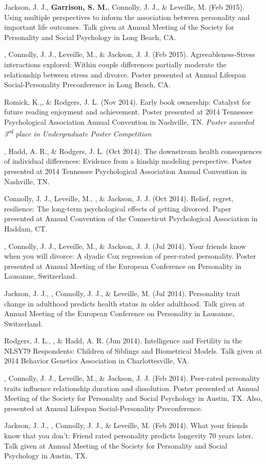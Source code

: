 \item Jackson, J. J., \textbf{Garrison, S. M.}, Connolly, J. J., \& Leveille, M. (Feb 2015). Using multiple perspectives to inform the association between personality and important life outcomes. Talk given at Annual Meeting of the Society for Personality and Social Psychology in Long Beach, CA.
\item\meb, Connolly, J. J., Leveille, M., \& Jackson, J. J. (Feb 2015). Agreeableness-Stress interactions explored: Within couple differences partially moderate the relationship between stress and divorce. Poster presented at Annual Lifespan Social-Personality Preconference in Long Beach, CA.
%
\item Romick, K.,\nota \meb, \& Rodgers, J. L. (Nov 2014). Early book ownership: Catalyst for future reading enjoyment and achievement. Poster presented at 2014 Tennessee Psychological Association Annual Convention in  Nashville, TN. \textit{Poster awarded 3\textsuperscript{rd} place in Undergraduate Poster Competition}
\item\meb, Hadd, A. R., \& Rodgers, J. L. (Oct 2014). The downstream health consequences of individual differences: Evidence from a kinship modeling perspective. Poster presented at 2014 Tennessee Psychological Association Annual Convention in Nashville, TN.
\item Connolly, J. J., Leveille, M., \meb, \& Jackson, J. J. (Oct 2014). Relief, regret, resilience: The long-term psychological effects of getting divorced. Paper presented at Annual Convention of the Connecticut Psychological Association in Haddam, CT.
\item\meb, Connolly, J. J., Leveille, M., \& Jackson, J. J. (Jul 2014). Your friends know when you will divorce: A dyadic Cox regression of peer-rated personality. Poster presented at Annual Meeting of the European Conference on Personality in Lausanne, Switzerland.
\item Jackson, J. J., \meb, Connolly, J. J., \& Leveille, M. (Jul 2014). Personality trait change in adulthood predicts health status in older adulthood. Talk given at Annual Meeting of the European Conference on Personality in Lausanne, Switzerland.
\item Rodgers, J. L., \meb, \& Hadd, A. R. (Jun 2014). Intelligence and Fertility in the NLSY79 Respondents: Children of Siblings and Biometrical Models. Talk given at 2014 Behavior Genetics Association in Charlottesville, VA. 

\item\meb, Connolly, J. J., Leveille, M., \& Jackson, J. J. (Feb 2014). Peer-rated personality traits influence relationship duration and dissolution. Poster presented at Annual Meeting of the Society for Personality and Social Psychology in Austin, TX. Also, presented at Annual Lifespan Social-Personality Preconference.
\item Jackson, J. J., \meb, Connolly, J. J., \& Leveille, M. (Feb 2014). What your friends know that you don't: Friend rated personality predicts longevity 70 years later. Talk given at Annual Meeting of the Society for Personality and Social Psychology in Austin, TX.

